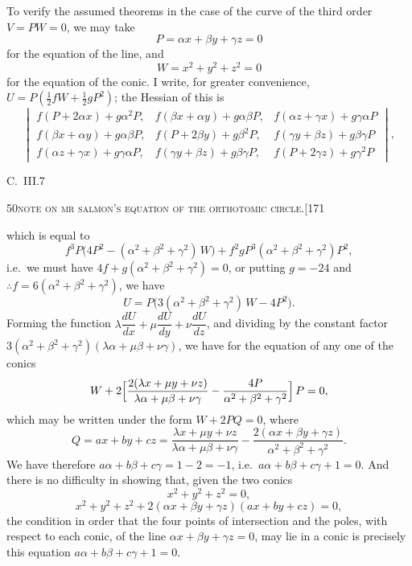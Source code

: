 \documentclass[11pt]{article}
\begin{document}
To verify the assumed theorems in the case of the curve of the third order
$V = PW = 0$, we may take
\[
P = \alpha x + \beta y + \gamma z = 0
\]
for the equation of the line, and
\[
W = x^{2} + y^{2} + z^{2} = 0
\]
for the equation of the conic. I write, for greater convenience, $U = P(\tfrac{1}{2} fW + \tfrac{1}{2} gP^{2})$;
the Hessian of this is
\[
\begin{vmatrix}
f(P + 2\alpha x) + g\alpha^{2}P,  & f(\beta x + \alpha y) + g\alpha\beta P, & f(\alpha z + \gamma x) + g\gamma\alpha P\\
f(\beta x + \alpha y) + g\alpha\beta P, & f(P + 2\beta y) + g\beta^{2}P,  & f(\gamma y + \beta z) + g\beta\gamma P\\
f(\alpha z + \gamma x) + g\gamma\alpha P, & f(\gamma y + \beta z) + g\beta\gamma P, & f(P + 2\gamma z) + g\gamma^{2}P
\end{vmatrix},
\]
\begin{flushright}\small C.\ III.\hfill 7\end{flushright}

\newpage

\begin{center}
\small\textsc{50}\hfill\textsc{note on mr salmon's equation of the orthotomic circle.}\hfill[171
\end{center}

\medskip

\noindent which is equal to
\[
f^{3}P\bigl(4P^{2} - (\alpha^{2} + \beta^{2} + \gamma^{2})\,W\bigr) + f^{2}gP^{3}(\alpha^{2} + \beta^{2} + \gamma^{2})P^{2},
\]
i.e.\ we must have $4f + g(\alpha^{2} + \beta^{2} + \gamma^{2}) = 0$, or putting $g = -24$ and $\therefore f = 6(\alpha^{2} + \beta^{2} + \gamma^{2})$,
we have
\[
U = P\bigl(3(\alpha^{2} + \beta^{2} + \gamma^{2})\,W - 4P^{2}\bigr).
\]
Forming the function $\lambda \dfrac{dU}{dx} + \mu \dfrac{dU}{dy} + \nu \dfrac{dU}{dz}$, and dividing by the constant factor
$3(\alpha^{2} + \beta^{2} + \gamma^{2})(\lambda \alpha + \mu \beta + \nu \gamma)$, we have for the equation of any one of the conics
\[
W + 2\Bigl[\frac{2(\lambda x + \mu y + \nu z)}{\lambda \alpha + \mu \beta + \nu \gamma} - \frac{4P}{\alpha^{2} + \beta^{2} + \gamma^{2}}\Bigr]\,P = 0,
\]
which may be written under the form $W + 2PQ = 0$, where
\[
Q = ax + by + cz = \frac{\lambda x + \mu y + \nu z}{\lambda \alpha + \mu \beta + \nu \gamma} - \frac{2(\alpha x + \beta y + \gamma z)}{\alpha^{2} + \beta^{2} + \gamma^{2}}.
\]
We have therefore $a\alpha + b\beta + c\gamma = 1 - 2 = -1$, i.e.\ $a\alpha + b\beta + c\gamma + 1 = 0$. And there is
no difficulty in showing that, given the two conics
\[
x^{2} + y^{2} + z^{2} = 0,
\]
\[
x^{2} + y^{2} + z^{2} + 2(\alpha x + \beta y + \gamma z)(ax + by + cz) = 0,
\]
the condition in order that the four points of intersection and the poles, with respect
to each conic, of the line $\alpha x + \beta y + \gamma z = 0$, may lie in a conic is precisely this equation
$a\alpha + b\beta + c\gamma + 1 = 0$.
\end{document}
